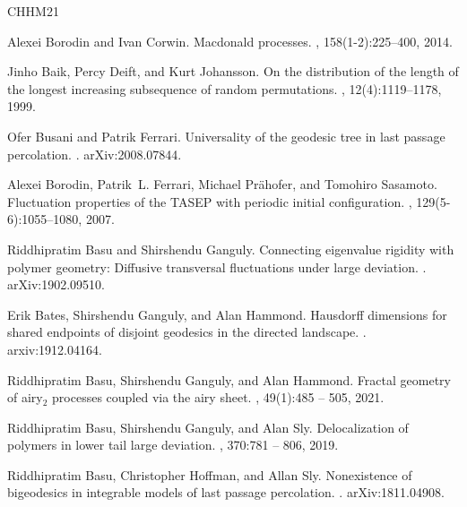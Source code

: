 \documentclass{article}
\numberwithin{equation}{section}
\begin{document}
\def\cydot{\leavevmode\raise.4ex\hbox{.}}
\begin{thebibliography}{CHHM21}
	
	Alexei Borodin and Ivan Corwin.
	\newblock Macdonald processes.
	, 158(1-2):225--400, 2014.
	
	Jinho Baik, Percy Deift, and Kurt Johansson.
	\newblock On the distribution of the length of the longest increasing
	subsequence of random permutations.
	, 12(4):1119--1178, 1999.
	
	Ofer Busani and Patrik Ferrari.
	\newblock Universality of the geodesic tree in last passage percolation.
	.
	\newblock arXiv:2008.07844.
	
	Alexei Borodin, Patrik~L. Ferrari, Michael Pr{\"a}hofer, and Tomohiro Sasamoto.
	\newblock Fluctuation properties of the {TASEP} with periodic initial
	configuration.
	, 129(5-6):1055--1080, 2007.
	
     Riddhipratim Basu and Shirshendu Ganguly.
     \newblock Connecting eigenvalue rigidity with polymer geometry: Diffusive transversal fluctuations under large deviation.
     .
     \newblock arXiv:1902.09510.
	
	Erik Bates, Shirshendu Ganguly, and Alan Hammond.
	\newblock Hausdorff dimensions for shared endpoints of disjoint geodesics in
	the directed landscape.
	.
	\newblock arxiv:1912.04164.
	
	Riddhipratim Basu, Shirshendu Ganguly, and Alan Hammond.
	\newblock Fractal geometry of airy$_2$ processes coupled via the airy sheet.
	, 49(1):485 -- 505, 2021.
	
	Riddhipratim Basu, Shirshendu Ganguly, and Alan Sly.
	\newblock Delocalization of polymers in lower tail large deviation.
	, 370:781 -- 806, 2019.
	
	Riddhipratim Basu, Christopher Hoffman, and Allan Sly.
	\newblock Nonexistence of bigeodesics in integrable models of last passage
	percolation.
	.
	\newblock arXiv:1811.04908.
	

\end{thebibliography}
\end{document}
